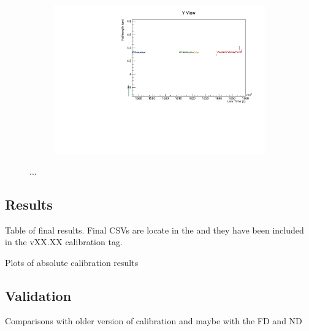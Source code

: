 \documentclass[12pt,a4paper]{article}
\begin{document}
\begin{figure}[h!]
\begin{subfigure}{0.5\textwidth}
  \end{subfigure}
  \begin{subfigure}{0.5\textwidth}
    \includegraphics[width=\linewidth]{driftsec_tb/cm_time_y.pdf}
  \end{subfigure}
  \caption{...}
  \label{figAbsCalibDrift2}
\end{figure}

\subsection{Results}
Table of final results.
Final CSVs are locate in the  and they have been included in the vXX.XX calibration tag.

Plots of absolute calibration results

\subsection{Validation}
Comparisons with older version of calibration and maybe with the FD and ND




\end{document}
